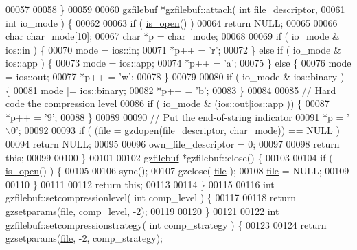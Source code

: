 \begin{DoxyCode}
00057 
00058 \}
00059 
00060 \hyperlink{classgzfilebuf}{gzfilebuf} *gzfilebuf::attach( \textcolor{keywordtype}{int} file\_descriptor,
00061                               \textcolor{keywordtype}{int} io\_mode ) \{
00062 
00063   \textcolor{keywordflow}{if} ( \hyperlink{classgzofstream_acb1c9c6dccaf41bc5e44c2263ea48de3}{is\_open}() )
00064     \textcolor{keywordflow}{return} NULL;
00065 
00066   \textcolor{keywordtype}{char} char\_mode[10];
00067   \textcolor{keywordtype}{char} *p = char\_mode;
00068 
00069   \textcolor{keywordflow}{if} ( io\_mode & ios::in ) \{
00070     mode = ios::in;
00071     *p++ = \textcolor{charliteral}{'r'};
00072   \} \textcolor{keywordflow}{else} \textcolor{keywordflow}{if} ( io\_mode & ios::app ) \{
00073     mode = ios::app;
00074     *p++ = \textcolor{charliteral}{'a'};
00075   \} \textcolor{keywordflow}{else} \{
00076     mode = ios::out;
00077     *p++ = \textcolor{charliteral}{'w'};
00078   \}
00079 
00080   \textcolor{keywordflow}{if} ( io\_mode & ios::binary ) \{
00081     mode |= ios::binary;
00082     *p++ = \textcolor{charliteral}{'b'};
00083   \}
00084 
00085   \textcolor{comment}{// Hard code the compression level}
00086   \textcolor{keywordflow}{if} ( io\_mode & (ios::out|ios::app )) \{
00087     *p++ = \textcolor{charliteral}{'9'};
00088   \}
00089 
00090   \textcolor{comment}{// Put the end-of-string indicator}
00091   *p = \textcolor{charliteral}{'\(\backslash\)0'};
00092 
00093   \textcolor{keywordflow}{if} ( (\hyperlink{structfile}{file} = gzdopen(file\_descriptor, char\_mode)) == NULL )
00094     \textcolor{keywordflow}{return} NULL;
00095 
00096   own\_file\_descriptor = 0;
00097 
00098   \textcolor{keywordflow}{return} \textcolor{keyword}{this};
00099 
00100 \}
00101 
00102 \hyperlink{classgzfilebuf}{gzfilebuf} *gzfilebuf::close() \{
00103 
00104   \textcolor{keywordflow}{if} ( \hyperlink{classgzofstream_acb1c9c6dccaf41bc5e44c2263ea48de3}{is\_open}() ) \{
00105 
00106     sync();
00107     gzclose( \hyperlink{structfile}{file} );
00108     \hyperlink{structfile}{file} = NULL;
00109 
00110   \}
00111 
00112   \textcolor{keywordflow}{return} \textcolor{keyword}{this};
00113 
00114 \}
00115 
00116 \textcolor{keywordtype}{int} gzfilebuf::setcompressionlevel( \textcolor{keywordtype}{int} comp\_level ) \{
00117 
00118   \textcolor{keywordflow}{return} gzsetparams(\hyperlink{structfile}{file}, comp\_level, -2);
00119 
00120 \}
00121 
00122 \textcolor{keywordtype}{int} gzfilebuf::setcompressionstrategy( \textcolor{keywordtype}{int} comp\_strategy ) \{
00123 
00124   \textcolor{keywordflow}{return} gzsetparams(\hyperlink{structfile}{file}, -2, comp\_strategy);

\end{DoxyCode}
